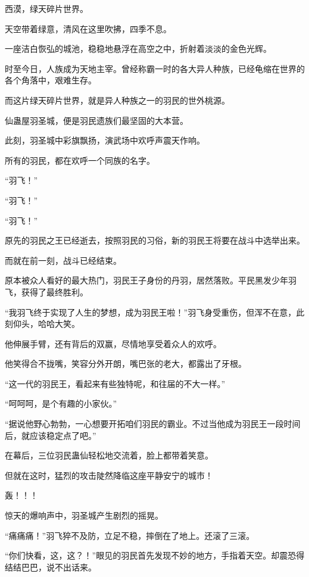 
\begin{this_body}



西漠，绿天碎片世界。

天空带着绿意，清风在这里吹拂，四季不息。

一座洁白恢弘的城池，稳稳地悬浮在高空之中，折射着淡淡的金色光辉。

时至今日，人族成为天地主宰。曾经称霸一时的各大异人种族，已经龟缩在世界的各个角落中，艰难生存。

而这片绿天碎片世界，就是异人种族之一的羽民的世外桃源。

仙蛊屋羽圣城，便是羽民遗族们最坚固的大本营。

此刻，羽圣城中彩旗飘扬，演武场中欢呼声震天作响。

所有的羽民，都在欢呼一个同族的名字。

“羽飞！”

“羽飞！”

“羽飞！”

原先的羽民之王已经逝去，按照羽民的习俗，新的羽民王将要在战斗中选举出来。

而就在前一刻，战斗已经结束。

原本被众人看好的最大热门，羽民王子身份的丹羽，居然落败。平民黑发少年羽飞，获得了最终胜利。

“我羽飞终于实现了人生的梦想，成为羽民王啦！”羽飞身受重伤，但浑不在意，此刻仰头，哈哈大笑。

他伸展手臂，还有背后的双赢，尽情地享受着众人的欢呼。

他笑得合不拢嘴，笑容分外开朗，嘴巴张的老大，都露出了牙根。

“这一代的羽民王，看起来有些独特呢，和往届的不大一样。”

“呵呵呵，是个有趣的小家伙。”

“据说他野心勃勃，一心想要开拓咱们羽民的霸业。不过当他成为羽民王一段时间后，就应该稳定点了吧。”

在幕后，三位羽民蛊仙轻松地交流着，脸上都带着笑意。

但就在这时，猛烈的攻击陡然降临这座平静安宁的城市！

轰！！！

惊天的爆响声中，羽圣城产生剧烈的摇晃。

“痛痛痛！”羽飞猝不及防，立足不稳，摔倒在了地上。还滚了三滚。

“你们快看，这，这？！”眼见的羽民首先发现不妙的地方，手指着天空。却震恐得结结巴巴，说不出话来。


\end{this_body}
